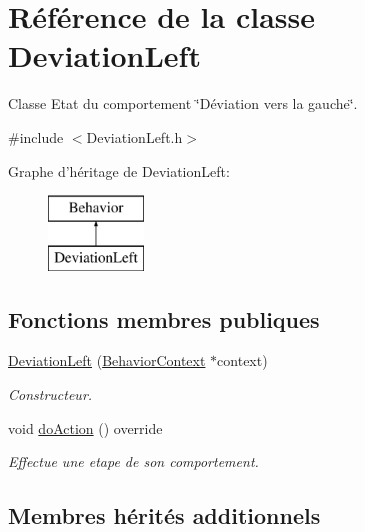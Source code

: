 \hypertarget{class_deviation_left}{\section{Référence de la classe Deviation\-Left}
\label{class_deviation_left}
}


Classe Etat du comportement \char`\"{}\-Déviation vers la gauche\char`\"{}.  




{\ttfamily \#include $<$Deviation\-Left.\-h$>$}

Graphe d'héritage de Deviation\-Left\-:\begin{figure}[H]
\begin{center}
\leavevmode
\includegraphics[height=2.000000cm]{class_deviation_left}
\end{center}
\end{figure}
\subsection*{Fonctions membres publiques}
{\bf }\par
\begin{DoxyCompactItemize}
\item 
\hyperlink{class_deviation_left_a6c4ca52d7b6eb31d57bf53c43939b644}{Deviation\-Left} (\hyperlink{class_behavior_context}{Behavior\-Context} $\ast$context)
\begin{DoxyCompactList}\small\item\em Constructeur. \end{DoxyCompactList}\item 
void \hyperlink{class_deviation_left_af11b0c3d1d3d8bf0685ad36ddbd35657}{do\-Action} () override
\begin{DoxyCompactList}\small\item\em Effectue une etape de son comportement. \end{DoxyCompactList}\end{DoxyCompactItemize}

\subsection*{Membres hérités additionnels}



